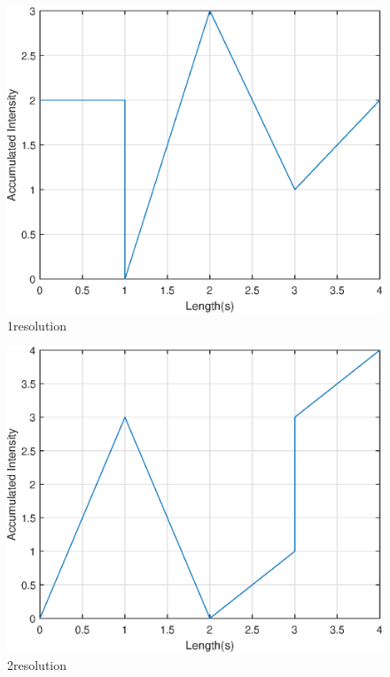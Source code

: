 \begin{figure}[htb!]
  \centering
  \includegraphics[width=\linewidth]{homework1/img/3.eps}
  \caption{1\textdegree resolution}
  \label{fig:recon_1deg}
\end{figure}
\begin{figure}[htb!]
  \centering
  \includegraphics[width=\linewidth]{homework1/img/2.eps}
  \caption{2\textdegree resolution}
  \label{fig:recon_5deg}
\end{figure}
